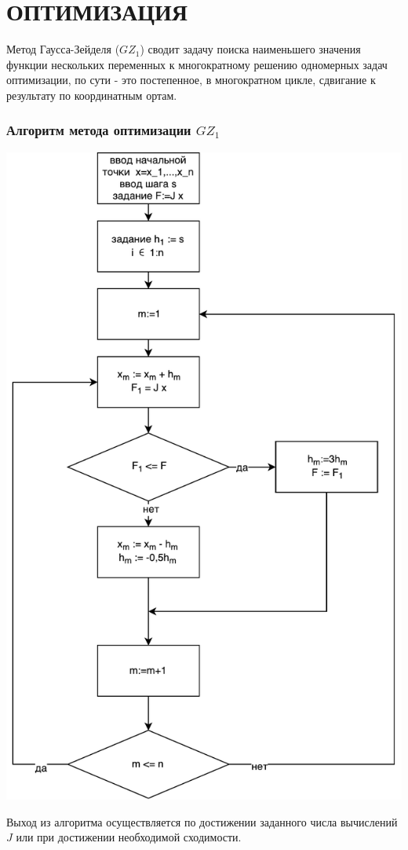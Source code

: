 \part{ОПТИМИЗАЦИЯ}
    Метод Гаусса-Зейделя ($GZ_1$) сводит задачу поиска наименьшего значения функции нескольких переменных к многократному решению одномерных задач оптимизации, по сути - это постепенное, в многократном цикле, сдвигание к результату по координатным ортам.
    \section*{Алгоритм метода оптимизации $GZ_1$}
        \begin{center}
            \includegraphics[scale=0.7]{img/gz1-alg}
        \end{center}
        Выход из алгоритма осуществляется по достижении заданного числа вычислений $J$ или при достижении необходимой сходимости.

